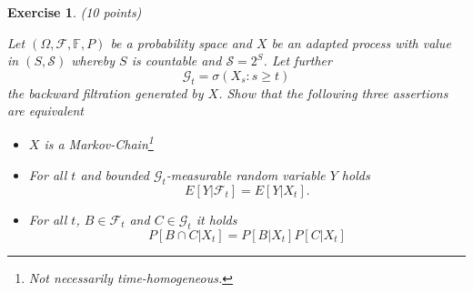 \documentclass[DIV=classic,a4paper,10pt]{scrartcl}
\newtheorem{exercise}[theorem]{Exercise}
\theoremstyle{nonumberplain}
\numberwithin{equation}{section}
\begin{document}
\begin{exercise}(10 points)

    Let $(\Omega,\mathcal{F},\mathbb{F},P)$ be a probability space and $X$ be an adapted process with value in $(S,\mathcal{S})$ whereby $S$ is countable and $\mathcal{S}=2^S$.
    Let further
    \begin{equation*}
        \mathcal{G}_t=\sigma(X_s\colon s\geq t)
    \end{equation*}
    the backward filtration generated by $X$.
    Show that the following three assertions are equivalent
    \begin{itemize}
        \item $X$ is a Markov-Chain\footnote{Not necessarily time-homogeneous.}
        \item For all $t$ and bounded $\mathcal{G}_t$-measurable random variable $Y$ holds
            \begin{equation*}
                E\left[ Y|\mathcal{F}_t \right]=E\left[ Y|X_t \right].
            \end{equation*}
        \item For all $t$, $B\in \mathcal{F}_t$ and $C \in \mathcal{G}_t$ it holds
            \begin{equation*}
                P\left[ B\cap C|X_t \right]=P\left[ B|X_t \right]P\left[ C|X_t \right]
            \end{equation*}
    \end{itemize}
\end{exercise}
\end{document}
